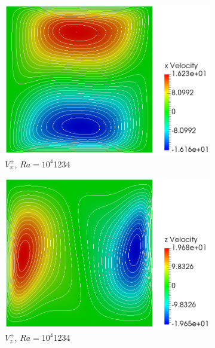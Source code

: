 \begin{figure}[!h]
\begin{subfigure}{0.32\textwidth}
  \centering
  \includegraphics[width=\linewidth]{figs/Ra4_u.png}
  \caption{\(V_x^+\), \(Ra=10^4\)\color{white}1234}
    \vspace*{0.5em}
\end{subfigure}
\begin{subfigure}{0.32\textwidth}
  \centering
  \includegraphics[width=\linewidth]{figs/Ra4_v.png}
  \caption{\(V_z^+\), \(Ra=10^4\)\color{white}1234}
    \vspace*{0.5em}
\end{subfigure}
\begin{subfigure}{0.32\textwidth}
  \centering

\end{subfigure}
\end{figure}
